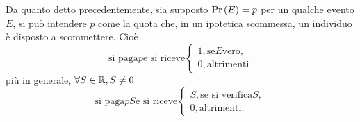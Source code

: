 \documentclass{subfiles}
\begin{document}
Da quanto detto precedentemente, sia supposto \(\Prob{E} = p\) per un qualche evento \(E\),
si può intendere \(p\) come la quota che, in un ipotetica scommessa, un individuo è disposto a scommettere.
Cioè
\[\text{si paga} p \text{e si riceve} \begin{cases}
        1, \text{se} E \text{vero}, \\
        0, \text{altrimenti}
    \end{cases}\]
più in generale, \(\forall S \in \operatorname{\mathbb{R}}, S \neq 0\)
\[\text{si paga} pS \text{e si riceve} \begin{cases}
        S, \text{se si verifica} S, \\
        0, \text{altrimenti}.
    \end{cases}\]
\end{document}

